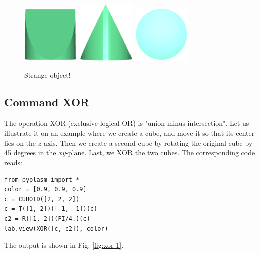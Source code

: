 \documentclass[article,A4,12pt]{llncs}
\begin{document}
\begin{figure}[!ht]
\begin{center}
\includegraphics[width=0.25\textwidth]{img/int-1a.png}
\includegraphics[width=0.25\textwidth]{img/int-1b.png}
\includegraphics[width=0.25\textwidth]{img/int-1c.png}
\end{center}
\vspace{-2mm}
\caption{Strange object!}
\label{fig:int-1}
\end{figure}


\subsection{Command XOR}

The operation XOR (exclusive logical OR) is "union minus intersection". Let us illustrate it 
on an example where we create a cube, and move it so that its center lies on the $z$-axis. Then 
we create a second cube by rotating the original cube by 45 degrees in the $xy$-plane. Last,
we XOR the two cubes. The corresponding code reads:
 
\begin{verbatim}
from pyplasm import *
color = [0.9, 0.9, 0.9]
c = CUBOID([2, 2, 2])
c = T([1, 2])([-1, -1])(c)
c2 = R([1, 2])(PI/4.)(c)
lab.view(XOR([c, c2]), color) 
\end{verbatim}
The output is shown in Fig. \ref{fig:xor-1}.
\end{document}
